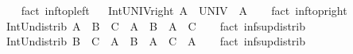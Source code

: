 \begin{isabellebody}
%
\isadelimproof
\ \ %
\endisadelimproof
%
\isatagproof
{}\isamarkupfalse%
\ {\isacharparenleft}{\kern0pt}fact\ inf{\isacharunderscore}{\kern0pt}top{\isacharunderscore}{\kern0pt}left{\isacharparenright}{\kern0pt}%
\endisatagproof
{\isafoldproof}%
%
\isadelimproof
%
\endisadelimproof
\ \isanewline
\isanewline
{}\isamarkupfalse%
\ Int{\isacharunderscore}{\kern0pt}UNIV{\isacharunderscore}{\kern0pt}right{\isacharcolon}{\kern0pt}\ {\isachardoublequoteopen}A\ {\isasyminter}\ UNIV\ {\isacharequal}{\kern0pt}\ A{\isachardoublequoteclose}\isanewline
%
\isadelimproof
\ \ %
\endisadelimproof
%
\isatagproof
{}\isamarkupfalse%
\ {\isacharparenleft}{\kern0pt}fact\ inf{\isacharunderscore}{\kern0pt}top{\isacharunderscore}{\kern0pt}right{\isacharparenright}{\kern0pt}%
\endisatagproof
{\isafoldproof}%
%
\isadelimproof
%
\endisadelimproof
\ \isanewline
\isanewline
{}\isamarkupfalse%
\ Int{\isacharunderscore}{\kern0pt}Un{\isacharunderscore}{\kern0pt}distrib{\isacharcolon}{\kern0pt}\ {\isachardoublequoteopen}A\ {\isasyminter}\ {\isacharparenleft}{\kern0pt}B\ {\isasymunion}\ C{\isacharparenright}{\kern0pt}\ {\isacharequal}{\kern0pt}\ {\isacharparenleft}{\kern0pt}A\ {\isasyminter}\ B{\isacharparenright}{\kern0pt}\ {\isasymunion}\ {\isacharparenleft}{\kern0pt}A\ {\isasyminter}\ C{\isacharparenright}{\kern0pt}{\isachardoublequoteclose}\isanewline
%
\isadelimproof
\ \ %
\endisadelimproof
%
\isatagproof
{}\isamarkupfalse%
\ {\isacharparenleft}{\kern0pt}fact\ inf{\isacharunderscore}{\kern0pt}sup{\isacharunderscore}{\kern0pt}distrib{}{\isacharparenright}{\kern0pt}%
\endisatagproof
{\isafoldproof}%
%
\isadelimproof
\isanewline
%
\endisadelimproof
\isanewline
{}\isamarkupfalse%
\ Int{\isacharunderscore}{\kern0pt}Un{\isacharunderscore}{\kern0pt}distrib{}{\isacharcolon}{\kern0pt}\ {\isachardoublequoteopen}{\isacharparenleft}{\kern0pt}B\ {\isasymunion}\ C{\isacharparenright}{\kern0pt}\ {\isasyminter}\ A\ {\isacharequal}{\kern0pt}\ {\isacharparenleft}{\kern0pt}B\ {\isasyminter}\ A{\isacharparenright}{\kern0pt}\ {\isasymunion}\ {\isacharparenleft}{\kern0pt}C\ {\isasyminter}\ A{\isacharparenright}{\kern0pt}{\isachardoublequoteclose}\isanewline
%
\isadelimproof
\ \ %
\endisadelimproof
%
\isatagproof
{}\isamarkupfalse%
\ {\isacharparenleft}{\kern0pt}fact\ inf{\isacharunderscore}{\kern0pt}sup{\isacharunderscore}{\kern0pt}distrib{}{\isacharparenright}{\kern0pt}%
\endisatagproof
{\isafoldproof}%
%
\isadelimproof
\isanewline
%
\endisadelimproof
\isanewline
{}\isamarkupfalse%

\end{isabellebody}

